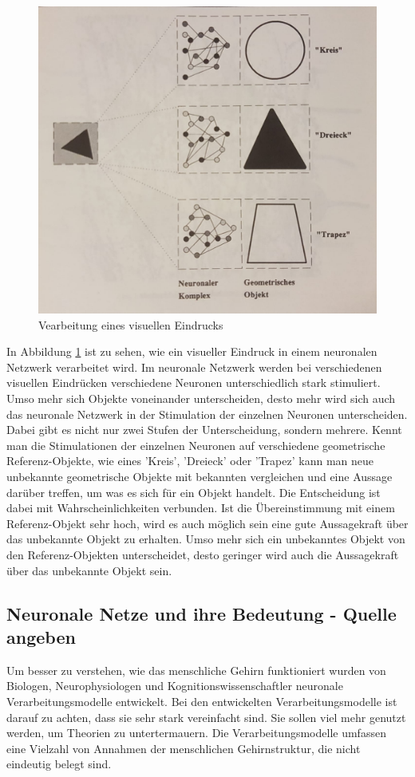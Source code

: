 \begin{figure}[hbt]
	\centering
	\includegraphics[width=0.9\linewidth]{./Bilder/VerarbeitungVisuellerEindruck-Kratzer}
	\caption{Vearbeitung eines visuellen Eindrucks \cite[S. 9]{Kratzer1991}}
	\label{fig:visuelleVerarbeitung}
\end{figure}

In Abbildung \ref{fig:visuelleVerarbeitung} ist zu sehen, wie ein visueller Eindruck in einem neuronalen Netzwerk verarbeitet wird. Im neuronale Netzwerk werden bei verschiedenen visuellen Eindrücken verschiedene Neuronen unterschiedlich stark stimuliert. Umso mehr sich Objekte voneinander unterscheiden, desto mehr wird sich auch das neuronale Netzwerk in der Stimulation der einzelnen Neuronen unterscheiden. Dabei gibt es nicht nur zwei Stufen der Unterscheidung, sondern mehrere. Kennt man die Stimulationen der einzelnen Neuronen auf verschiedene geometrische Referenz-Objekte, wie eines 'Kreis', 'Dreieck' oder 'Trapez' kann man neue unbekannte geometrische Objekte mit bekannten vergleichen und eine Aussage darüber treffen, um was es sich für ein Objekt handelt. Die Entscheidung ist dabei mit Wahrscheinlichkeiten verbunden. Ist die Übereinstimmung mit einem Referenz-Objekt sehr hoch, wird es auch möglich sein eine gute Aussagekraft über das unbekannte Objekt zu erhalten. Umso mehr sich ein unbekanntes Objekt von den Referenz-Objekten unterscheidet, desto geringer wird auch die Aussagekraft über das unbekannte Objekt sein.

\subsection{Neuronale Netze und ihre Bedeutung - Quelle angeben}
Um besser zu verstehen, wie das menschliche Gehirn funktioniert wurden von Biologen, Neurophysiologen und Kognitionswissenschaftler neuronale Verarbeitungsmodelle entwickelt. Bei den entwickelten Verarbeitungsmodelle ist darauf zu achten, dass sie sehr stark vereinfacht sind. Sie sollen viel mehr genutzt werden, um Theorien zu untertermauern. Die Verarbeitungsmodelle umfassen eine Vielzahl von Annahmen der menschlichen Gehirnstruktur, die nicht eindeutig belegt sind.

